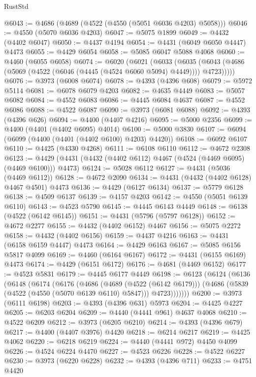 \begin{lexlean}{RustStd}
\begin{coremodule}
@6043 := @4686 (@4689 (@4522 (@4550 (@5051 @6036 @4203) @5058)))
@6046 := @4550 (@5070 @6036 @4203)
@6047 := @5075 @1899
@6049 := @4432 (@4402 @6047)
@6050 := @4437 @4194
@6054 := @4431 (@6049 @6050 @4447) @4473
@6055 := @4429 @6054
@6058 := @5085 @6047 @5088 @4068
@6060 := @4460 (@6055 @6058)
@6074 := @6020
    (@6021
      (@6033
        (@6035 (@6043 (@4686 (@5069 (@4522 (@6046 (@4445 (@4524 @6060 @5094) @4449)))) @4723)))))
@6076 := @3973 (@6008 @6074)
@6078 := @4393 (@4396 @608)
@6079 := @5972 @5114
@6081 := @6078 @6079 @4203
@6082 := @4635 @4449
@6083 := @5057 @6082
@6084 := @4552 @6083
@6086 := @4445 @6084 @4637
@6087 := @4552 @6086
@6088 := @4522 @6087
@6090 := @3973 (@6081 @6088)
@6092 := @4393 (@4396 @626)
@6094 := @4400 (@4407 @4216)
@6095 := @5000 @2356
@6099 := @4400 (@4401 (@4402 @6095) @4014)
@6100 := @5000 @3830
@6107 := @6094 (@6099 (@4400 (@4401 (@4402 @6100) @4203) @4420))
@6108 := @6092 @6107
@6110 := @4425 (@4330 @4268)
@6111 := @6108 @6110
@6112 := @4672 @2308
@6123 := @4429 (@4431 (@4432 (@4402 @6112) @4467 (@4524 (@4469 @6095) (@4469 @6100))) @4473)
@6124 := @5028 @6112
@6127 := @4431 (@5036 (@4469 @6112))
@6128 := @4672 @2090
@6134 := @4431 (@4432 (@4402 @6128) @4467 @4501) @4473
@6136 := @4429 (@6127 @6134)
@6137 := @5779 @6128
@6138 := @4509 @6137
@6139 := @4157 @4203
@6142 := @4550 (@5051 @6139 @6110)
@6143 := @4523 @5790
@6145 := @4445 @6143 @4449
@6148 := @6138 (@4522 (@6142 @6145))
@6151 := @4431 (@5796 (@5797 @6128))
@6152 := @4672 @2277
@6155 := @4432 (@4402 @6152) @4467
@6156 := @5075 @2272
@6158 := @4432 (@4402 @6156)
@6159 := @4437 @4216
@6163 := @4431 (@6158 @6159 @4447) @4473
@6164 := @4429 @6163
@6167 := @5085 @6156 @5817 @4099
@6169 := @4460 (@6164 @6167)
@6172 := @4431 (@6155 @6169) @4473
@6174 := @4429 (@6151 @6172)
@6176 := @4681 (@4469 @6152)
@6177 := @4523 @5831
@6179 := @4445 @6177 @4449
@6198 := @6123
    (@6124
      (@6136
        (@6148
          (@6174
            (@6176
              (@4686
                (@4689 (@4522 (@6142 @6179)))
                (@4686 (@5839 (@4522 (@4550 (@5070 @6139 @6110) @5847))) @4723)))))))
@6200 := @3973 (@6111 @6198)
@6203 := @4393 (@4396 @631) @5973
@6204 := @4425 @4227
@6205 := @6203 @6204
@6209 := @4440 (@4441 @961) @4637 @4068
@6210 := @4522 @6209
@6212 := @3973 (@6205 @6210)
@6214 := @4393 (@4396 @679)
@6217 := @4400 (@4407 @3976) @4420
@6218 := @6214 @6217
@6219 := @4425 @4062
@6220 := @6218 @6219
@6224 := @4440 (@4441 @972) @4450 @4099
@6226 := @4524 @6224 @4470
@6227 := @4523 @6226
@6228 := @4522 @6227
@6230 := @3973 (@6220 @6228)
@6232 := @4393 (@4396 @711)
@6233 := @4751 @4420

\end{coremodule}
\end{lexlean}
